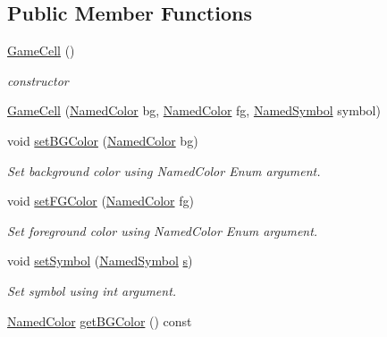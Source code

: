 \subsection*{Public Member Functions}
\begin{DoxyCompactItemize}
\item 
\hyperlink{classbridges_1_1game_1_1_game_cell_a750114853f2f0f7519cb663352230868}{Game\+Cell} ()
\begin{DoxyCompactList}\small\item\em constructor \end{DoxyCompactList}\item 
\hyperlink{classbridges_1_1game_1_1_game_cell_a743b618fc8553aa9aac33ddc3bb65a79}{Game\+Cell} (\hyperlink{namespacebridges_1_1game_afaa832a4322b25b6a4ebfba832f10f26}{Named\+Color} bg, \hyperlink{namespacebridges_1_1game_afaa832a4322b25b6a4ebfba832f10f26}{Named\+Color} fg, \hyperlink{namespacebridges_1_1game_ab9a19c7ab6e2ebac2f95180e21733487}{Named\+Symbol} symbol)
\item 
void \hyperlink{classbridges_1_1game_1_1_game_cell_ac2ee6a35500564b3df970551dcf56892}{set\+B\+G\+Color} (\hyperlink{namespacebridges_1_1game_afaa832a4322b25b6a4ebfba832f10f26}{Named\+Color} bg)
\begin{DoxyCompactList}\small\item\em Set background color using Named\+Color Enum argument. \end{DoxyCompactList}\item 
void \hyperlink{classbridges_1_1game_1_1_game_cell_a899b56c1561ca4acacc42e9d740aa19a}{set\+F\+G\+Color} (\hyperlink{namespacebridges_1_1game_afaa832a4322b25b6a4ebfba832f10f26}{Named\+Color} fg)
\begin{DoxyCompactList}\small\item\em Set foreground color using Named\+Color Enum argument. \end{DoxyCompactList}\item 
void \hyperlink{classbridges_1_1game_1_1_game_cell_abd0dde526adf160bf5d026e24410645a}{set\+Symbol} (\hyperlink{namespacebridges_1_1game_ab9a19c7ab6e2ebac2f95180e21733487}{Named\+Symbol} \hyperlink{namespacebridges_1_1game_ab9a19c7ab6e2ebac2f95180e21733487a03c7c0ace395d80182db07ae2c30f034}{s})
\begin{DoxyCompactList}\small\item\em Set symbol using int argument. \end{DoxyCompactList}\item 
\hyperlink{namespacebridges_1_1game_afaa832a4322b25b6a4ebfba832f10f26}{Named\+Color} \hyperlink{classbridges_1_1game_1_1_game_cell_abfe53785cb331ee73455ef4f7c2f1ba6}{get\+B\+G\+Color} () const

\end{DoxyCompactItemize}

